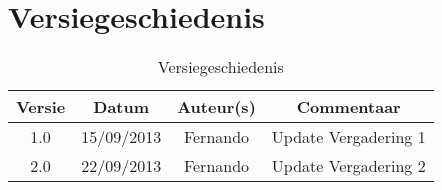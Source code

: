 \chapter{Versiegeschiedenis}

\begin{table}[htbp]
	\centering
	\caption{Versiegeschiedenis}	
	\begin{tabular} {|c|c|c|c|}
	    \hline
		\textbf{Versie} & \textbf{Datum} 	& \textbf{Auteur(s)} & \textbf{Commentaar} \\
		\hline
		1.0 & 15/09/2013 & Fernando & Update Vergadering 1 \\
		\hline
		2.0 & 22/09/2013 & Fernando & Update Vergadering 2 \\
		\hline
	\end{tabular}
	
\end{table}